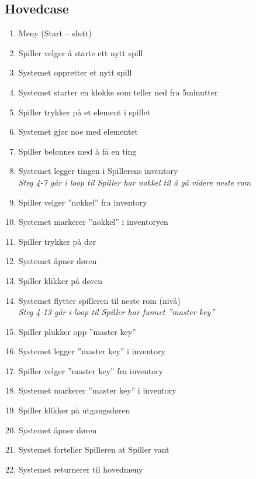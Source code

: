 \documentclass[a4paper]{article}
\begin{document}
\subsection{Hovedcase}
\begin{enumerate}
\item Meny (Start – slutt)
\item Spiller velger å starte ett nytt spill
\item Systemet oppretter et nytt spill
\item Systemet starter en klokke som teller ned fra 5minutter
\item Spiller trykker på et element i spillet
\item Systemet gjør noe med elementet
\item Spiller belønnes med å få en ting
\item Systemet legger tingen i Spillerens inventory\\

\textit{Steg 4-7 går i loop til Spiller har nøkkel til å gå videre neste rom}
\item Spiller velger ''nøkkel'' fra inventory
\item Systemet markerer ''nøkkel'' i inventoryen
\item Spiller trykker på dør
\item Systemet åpner døren
\item Spiller klikker på døren
\item Systemet flytter spilleren til neste rom (nivå)\\

\textit{Steg 4-13 går i loop til Spiller har funnet ''master key''}
\item Spiller plukker opp ''master key''
\item Systemet legger ''master key'' i inventory
\item Spiller velger ''master key'' fra inventory
\item Systemet markerer ''master key'' i inventory
\item Spiller klikker på utgangsdøren
\item Systemet åpner døren
\item Systemet forteller Spilleren at Spiller vant
\item Systemet returnerer til hovedmeny
\end{enumerate}
\end{document}
